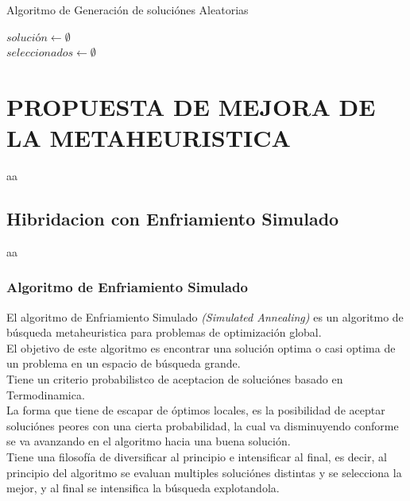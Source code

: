 \documentclass{article}
\begin{document}
\begin{algorithm}
  \label{Algoritmo de Generacion de soluciónes Aleatorias}
  \caption{Algoritmo de Generación de soluciónes Aleatorias}
\vspace{3mm}

$solución \leftarrow \emptyset $\\
$seleccionados \leftarrow \emptyset $\\
\vspace{3mm}

\end{algorithm}

\vspace{3mm}




\newpage
\section{\large PROPUESTA DE MEJORA DE LA METAHEURISTICA}
aa
\subsection{\normalsize Hibridacion con Enfriamiento Simulado}
aa
\subsubsection{\scriptsize Algoritmo de Enfriamiento Simulado}
El algoritmo de Enfriamiento Simulado \emph{(Simulated Annealing)} es un algoritmo de búsqueda metaheuristica 
para problemas de optimización global.\\
El objetivo de este algoritmo es encontrar una solución optima o casi optima de un problema en un espacio 
de búsqueda grande.\\
Tiene un criterio probabilistco de aceptacion de soluciónes basado en Termodinamica.\\
La forma que tiene de escapar de óptimos locales, es la posibilidad de aceptar soluciónes peores con una cierta probabilidad,
la cual va disminuyendo conforme se va avanzando en el algoritmo hacia una buena solución.\\
Tiene una filosofía de diversificar al principio e intensificar al final, es decir, al principio del algoritmo
se evaluan multiples soluciónes distintas y se selecciona la mejor, y al final se intensifica la búsqueda
explotandola.
\vspace{5mm}
\end{document}
